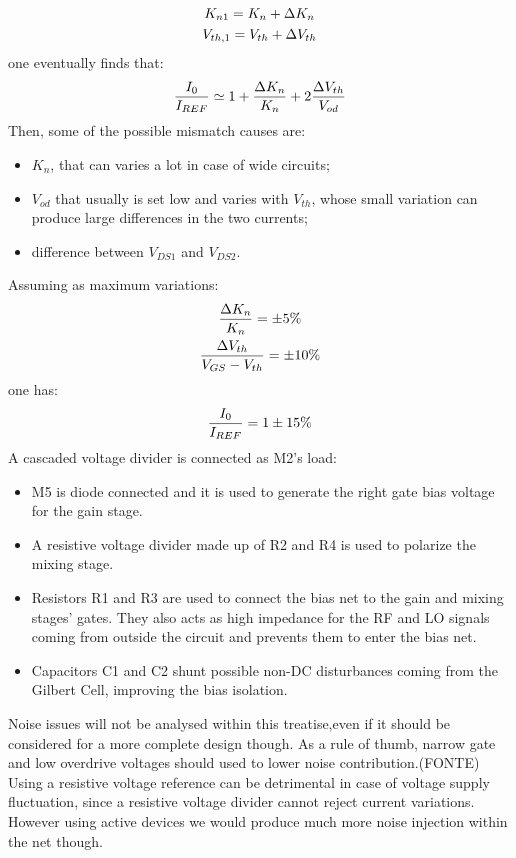 \begin{gather}
K_{n1}=K_n+\Delta K_n \notag \\
V_{th,1} = V_{th}+\Delta V_{th} \notag
\end{gather}
one eventually finds that:
\begin{equation}
\frac{I_0}{I_{REF}} \simeq 1 + \frac{\Delta K_n}{K_n}+2\frac{\Delta V_{th}}{V_{od}} \notag
\end{equation}
Then, some of the possible mismatch causes are:
\begin{itemize}
	\item $K_n$, that can varies a lot in case of wide circuits;
	\item $V_{od}$ that usually is set low and varies with $V_{th}$, whose small variation can produce large differences in the two currents;
	\item difference between $V_{DS1}$ and $V_{DS2}$.
\end{itemize}
Assuming as maximum variations:
\begin{gather}
\frac{\Delta K_n}{K_n} = \pm 5 \% \notag \\
\frac{\Delta V_{th}}{V_{GS}-V_{th}} = \pm 10 \% \notag
\end{gather}
one has:
\begin{equation}
\frac{I_0}{I_{REF}} = 1 \pm 15 \% \notag
\end{equation}
A cascaded voltage divider is connected as M2's load: 
\begin{itemize}
	\item M5 is diode connected and it is used to generate the right gate bias voltage for the gain stage.
	\item A resistive voltage divider made up of R2 and R4 is used to polarize the mixing stage.
	\item Resistors R1 and R3 are used to connect the bias net to the gain and mixing stages' gates. They also acts as high impedance for the RF and LO signals coming from outside the circuit and prevents them to enter the bias net.
	\item Capacitors C1 and C2 shunt possible non-DC disturbances coming from the Gilbert Cell, improving the bias isolation.
\end{itemize}

Noise issues will not be analysed within this treatise,even if it should be considered for a more complete design though. As a rule of thumb, narrow gate and low overdrive voltages should used to lower noise contribution.(FONTE) 
Using a resistive voltage reference can be detrimental in case of voltage supply fluctuation, since a resistive voltage divider cannot reject current variations. However using active devices we would produce much more noise injection within the net though.

